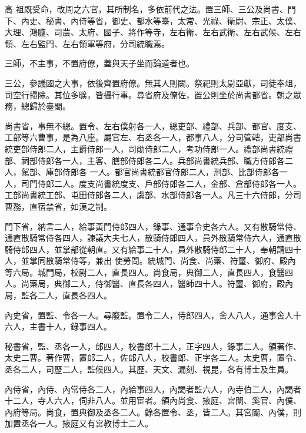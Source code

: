 
\begin{pinyinscope}

 高
 祖既受命，改周之六官，其所制名，多依前代之法。置三師、三公及尚書、門下、內史、秘書、內侍等省，御史、都水等臺，太常、光祿、衛尉、宗正、太僕、大理、鴻臚、司農、太府、國子、將作等寺，左右衛、左右武衛、左右武候、左右領、左右監門、左右領軍等府，分司統職焉。



 三師，不主事，不置府僚，蓋與天子坐而論道者也。



 三公，參議國之大事，依後齊置府僚。無其人則闕。祭祀則太尉亞獻，司徒奉俎，司空行掃除。其位多曠，皆攝行事。尋省府及僚佐，置公則坐於尚書都省。朝之眾務，總歸於臺閣。



 尚書省，事無不總。置令、左右僕射各一人，總吏部、禮部、兵部、都官、度支、工部等六曹事，是為八座。屬官左、右丞各一人，都事八人，分司管轄，吏部尚書統吏部侍郎二人，主爵侍郎一人，司勛侍郎二人，考功侍郎一人。禮部尚書統禮部、祠部侍郎各一人，主客、膳部侍郎各二人。兵部尚書統兵部、職方侍郎各二人，駕部、庫部侍郎各
 一人。都官尚書統都官侍郎二人，刑部、比部侍郎各一人，司門侍郎二人。度支尚書統度支、戶部侍郎各二人，金部、倉部侍郎各一人。工部尚書統工部、屯田侍郎各二人，虞部、水部侍郎各一人。凡三十六侍郎，分司曹務，直宿禁省，如漢之制。



 門下省，納言二人，給事黃門侍郎四人，錄事、通事令史各六人。又有散騎常侍、通直散騎常侍各四人，諫議大夫七人，散騎侍郎四人，員外散騎常侍六人，通直散騎侍郎四人，並掌部從朝直。又有給事二十人，員外散騎侍郎二十人，奉朝請四十人，並掌同散騎常侍等，兼出
 使勞問。統城門、尚食、尚藥、符璽、御府、殿內等六局。城門局，校尉二人，直長四人。尚食局，典御二人，直長四人，食醫四人。尚藥局，典御二人，侍御醫、直長各四人，醫師四十人。符璽、御府，殿內局，監各二人，直長各四人。



 內史省，置監、令各一人。尋廢監。置令二人，侍郎四人，舍人八人，通事舍人十六人，主書十人，錄事四人。



 秘書省，監、丞各一人，郎四人，校書郎十二人，正字四人，錄事二人。領著作、太史二曹。著作曹，置郎二人，佐郎八人，校書郎、正字各二人。太史曹，置令、丞各二人，司歷二人，監候四人。其歷、天文、漏刻、視昆，各有博士及生員。



 內侍省，內侍、內常侍各二人，內給事四人，內謁者監六人，內寺伯二人，內謁者十二人，寺人六人，伺非八人。並用宦者。領內尚食、掖庭、宮闈、奚官、內僕、內府等局。尚食，置典御及丞各二人。餘各置令、丞，皆二人。其宮闈、內僕，則加置丞各一人。掖庭又有宮教博士二人。




\end{pinyinscope}

